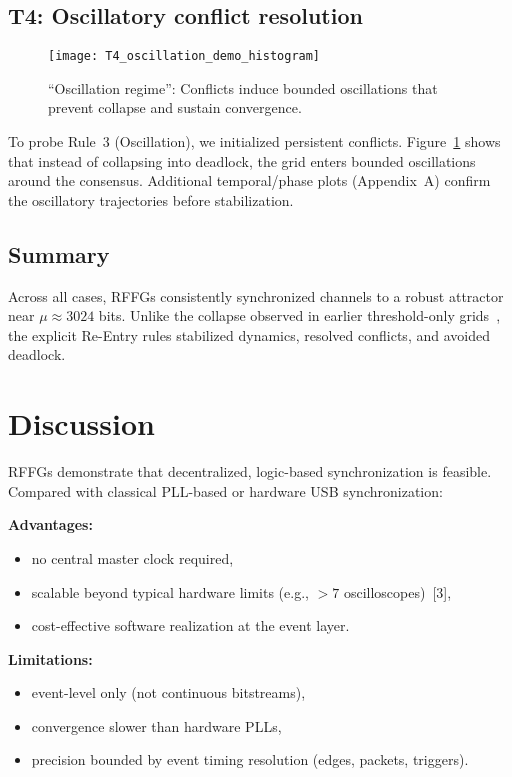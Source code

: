 \documentclass[11pt]{article}
\begin{document}
\subsection*{T4: Oscillatory conflict resolution}
\begin{figure}[htbp!]
  \centering
  \texttt{[image: T4\_oscillation\_demo\_histogram]}
  \caption{\enquote{Oscillation regime}: Conflicts induce bounded oscillations that prevent collapse and sustain convergence.}
  \label{fig:T4_hist}
\end{figure}
To probe Rule~3 (Oscillation), we initialized persistent conflicts.  
Figure~\ref{fig:T4_hist} shows that instead of collapsing into deadlock, the grid enters bounded oscillations around the consensus. Additional temporal/phase plots (Appendix~A) confirm the oscillatory trajectories before stabilization.


\subsection*{Summary}
Across all cases, RFFGs consistently synchronized channels to a robust attractor near $\mu \approx 3024$ bits. Unlike the collapse observed in earlier threshold-only grids~\cite{lba2025}, the explicit Re-Entry rules stabilized dynamics, resolved conflicts, and avoided deadlock.

\section{Discussion}
RFFGs demonstrate that decentralized, logic-based synchronization is feasible. Compared with classical PLL-based or hardware USB synchronization:

\textbf{Advantages:}
\begin{itemize}
  \item no central master clock required,
  \item scalable beyond typical hardware limits (e.g., $>7$ oscilloscopes)~[3],
  \item cost-effective software realization at the event layer.
\end{itemize}

\textbf{Limitations:}
\begin{itemize}
  \item event-level only (not continuous bitstreams),
  \item convergence slower than hardware PLLs,
  \item precision bounded by event timing resolution (edges, packets, triggers).
\end{itemize}
\end{document}
